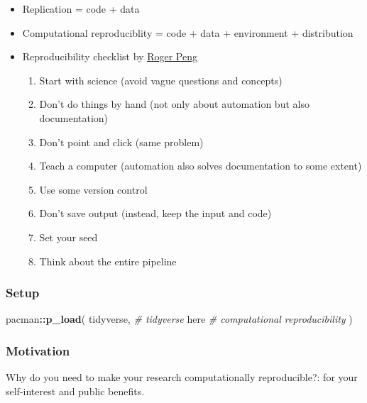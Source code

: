\documentclass[
]{book}
\newenvironment{Shaded}{\begin{snugshade}}{\end{snugshade}}
\newcommand{\CommentTok}[1]{\textcolor[rgb]{0.56,0.35,0.01}{\textit{#1}}}
\newcommand{\KeywordTok}[1]{\textcolor[rgb]{0.13,0.29,0.53}{\textbf{#1}}}
\newcommand{\NormalTok}[1]{#1}
\newcommand{\OperatorTok}[1]{\textcolor[rgb]{0.81,0.36,0.00}{\textbf{#1}}}
\begin{document}
\begin{itemize}
\item
  Replication = code + data
\item
  Computational reproduciblity = code + data + environment + distribution
\item
  Reproducibility checklist by \href{http://www.biostat.jhsph.edu/~rpeng/}{Roger Peng}

  \begin{enumerate}
  \def\labelenumi{\arabic{enumi}.}
  \item
    Start with science (avoid vague questions and concepts)
  \item
    Don't do things by hand (not only about automation but also documentation)
  \item
    Don't point and click (same problem)
  \item
    Teach a computer (automation also solves documentation to some extent)
  \item
    Use some version control
  \item
    Don't save output (instead, keep the input and code)
  \item
    Set your seed
  \item
    Think about the entire pipeline
  \end{enumerate}
\end{itemize}

\hypertarget{setup-1}{%
\subsubsection{Setup}\label{setup-1}}

\begin{Shaded}
\begin{Highlighting}[]
\NormalTok{pacman}\OperatorTok{::}\KeywordTok{p\_load}\NormalTok{(}
\NormalTok{  tidyverse, }\CommentTok{\# tidyverse}
\NormalTok{  here }\CommentTok{\# computational reproducibility}
\NormalTok{)}
\end{Highlighting}
\end{Shaded}

\hypertarget{motivation-1}{%
\subsubsection{Motivation}\label{motivation-1}}

Why do you need to make your research computationally reproducible?: for your self-interest and public benefits.
\end{document}
